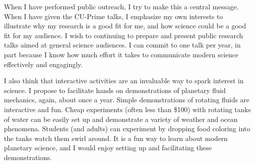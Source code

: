 \documentclass[12pt]{article}
\begin{document}
When I have performed public outreach, I try to make this a central message.
When I have given the CU-Prime talks, I emphasize my own interests to illustrate why my research is a good fit for me, and how science could be a good fit for my audience. 
I wish to continuing to prepare and present public research talks aimed at general science audiences.
I can commit to one talk per year, in part because I know how much effort it takes to communicate modern science effectively and engagingly.

I also think that interactive activities are an invaluable way to spark interest in science. 
I propose to facilitate hands on demonstrations of planetary fluid mechanics, again, about once a year.
Simple demonstrations of rotating fluids are interactive and fun.
Cheap experiments (often less than \$100) with rotating tanks of water can be easily set up and demonstrate a variety of weather and ocean phenomena. Students (and adults) can experiment by dropping food coloring into the tanks watch them swirl around. It is a fun way to learn about modern planetary science, and I would enjoy setting up and facilitating these demonstrations. 

\printbibliography
\end{document}
